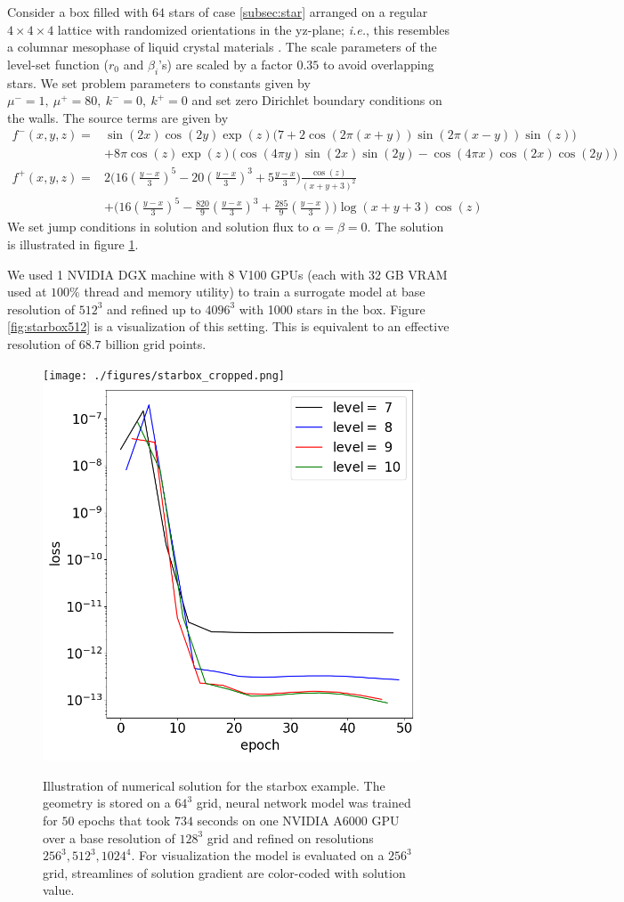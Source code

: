 \documentclass{elsarticle}
\begin{document}
Consider a box filled with $64$ stars of case \ref{subsec:star} arranged on a regular $4\times 4\times 4$ lattice with randomized orientations in the yz-plane; \textit{i.e.}, this resembles a columnar mesophase of liquid crystal materials \cite{oswald2005smectic,ANDRIENKO2018520}. The scale parameters of the level-set function ($r_0$ and $\beta_i$'s) are scaled by a factor $0.35$ to avoid overlapping stars. We set problem parameters to constants given by $\mu^-= 1,\ \mu^+=80,\ k^-=0,\ k^+=0 $ and set zero Dirichlet boundary conditions on the walls. The source terms are given by
\begin{align*}
f^-(x,y,z)=& \sin(2 x)\cos(2 y) \exp(z) \bigg(7  + 2 \cos(2 \pi (x+y)) \sin(2\pi(x-y))\sin(z)\bigg)  \\
&  +8\pi \cos(z) \exp(z) \bigg(\cos(4\pi y) \sin(2 x) \sin(2 y) -\cos(4\pi x) \cos(2 x)\cos(2 y) \bigg) \\
f^+(x,y,z)=&  2 \bigg( 16(\frac{y-x}{3})^5 - 20(\frac{y-x}{3})^3 + 5\frac{y-x}{3} \bigg) \frac{\cos(z)}{ (x+y+3)^2}  \\
& +\bigg( 16 (\frac{y-x}{3})^5 -\frac{820}{9} (\frac{y-x}{3})^3 + \frac{285}{9}(\frac{y-x}{3}) \bigg) \log(x+y+3)\cos(z)
\end{align*}
We set jump conditions in solution and solution flux to $\alpha=\beta=0$. The solution is illustrated in figure \ref{fig:starbox}.

We used 1 NVIDIA DGX machine with 8 V100 GPUs (each with 32 GB VRAM used at $100\%$ thread and memory utility) to train a surrogate model at base resolution of $512^3$ and refined up to $4096^3$ with 1000 stars in the box. Figure \ref{fig:starbox512} is a visualization of this setting. This is equivalent to an effective resolution of $68.7$ billion grid points.

\begin{figure}
	\centering
	\texttt{[image: ./figures/starbox\_cropped.png]}
	\includegraphics[width=0.49\linewidth]{./figures/poisson_solver_loss_starbox.png}
	\caption{Illustration of numerical solution for the starbox example. The geometry is stored on a $64^3$ grid, neural network model was trained for $50$ epochs that took $734$ seconds on one NVIDIA A6000 GPU over a base resolution of $128^3$ grid and refined on resolutions $256^3,512^3,1024^4$. For visualization the model is evaluated on a $256^3$ grid, streamlines of solution gradient are color-coded with solution value.}
	\label{fig:starbox}
\end{figure}
\end{document}
